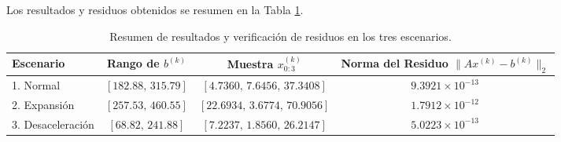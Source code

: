 \documentclass[11pt,a4paper]{article}
\theoremstyle{definition}
\theoremstyle{remark}
\begin{document}
Los resultados y residuos obtenidos se resumen en la Tabla \ref{tab:residuos_plu}.
\begin{table}[h!]
    \centering
    \small
    \caption{Resumen de resultados y verificación de residuos en los tres escenarios.}
    \label{tab:residuos_plu}
    \begin{tabular}{lccc}
        \toprule
        \textbf{Escenario} & \textbf{Rango de $b^{(k)}$} & \textbf{Muestra $x^{(k)}_{0:3}$} & \textbf{Norma del Residuo $\|Ax^{(k)} - b^{(k)}\|_2$} \\
        \midrule
        1. Normal & $[182.88, \, 315.79]$ & $[4.7360, \, 7.6456, \, 37.3408]$ & $9.3921 \times 10^{-13}$ \\
        2. Expansión & $[257.53, \, 460.55]$ & $[22.6934, \, 3.6774, \, 70.9056]$ & $1.7912 \times 10^{-12}$ \\
        3. Desaceleración & $[68.82, \, 241.88]$ & $[7.2237, \, 1.8560, \, 26.2147]$ & $5.0223 \times 10^{-13}$ \\
        \bottomrule
    \end{tabular}
\end{table}
\end{document}
